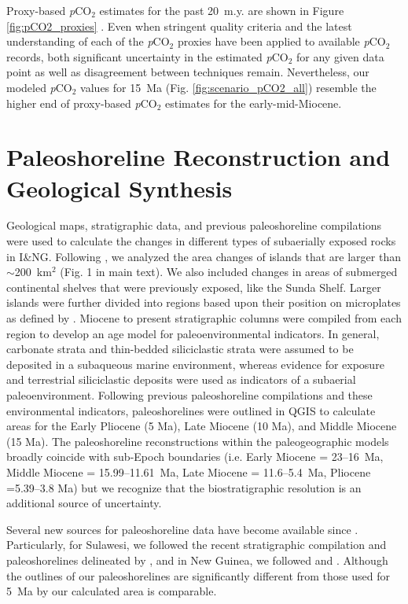 \documentclass[11pt,letterpaper]{article}
\newcommand{\pCOtwo}{\textit{p}CO$_{2}$\xspace}
\begin{document}
Proxy-based \pCOtwo estimates for the past 20~m.y. are shown in Figure \ref{fig:pCO2_proxies} \citep{Bereiter2015a, Foster2017a, Ji2018a}. Even when stringent quality criteria and the latest understanding of each of the \pCOtwo proxies have been applied to available \pCOtwo records, both significant uncertainty in the estimated \pCOtwo for any given data point as well as disagreement between techniques remain. Nevertheless, our modeled \pCOtwo values for 15~Ma (Fig. \ref{fig:scenario_pCO2_all}) resemble the higher end of proxy-based \pCOtwo estimates for the early-mid-Miocene.

\section*{Paleoshoreline Reconstruction and Geological Synthesis}

Geological maps, stratigraphic data, and previous paleoshoreline compilations were used to calculate the changes in different types of subaerially exposed rocks in I\&NG. Following \citet{Molnar2015a}, we analyzed the area changes of islands that are larger than $\sim$200~km$^{2}$ (Fig. 1 in main text). We also included changes in areas of submerged continental shelves that were previously exposed, like the Sunda Shelf. Larger islands were further divided into regions based upon their position on microplates as defined by \citep{Matthews2016a}. Miocene to present stratigraphic columns were compiled from each region to develop an age model for paleoenvironmental indicators. In general, carbonate strata and thin-bedded siliciclastic strata were assumed to be deposited in a subaqueous marine environment, whereas evidence for exposure and terrestrial siliciclastic deposits were used as indicators of a subaerial paleoenvironment. Following previous paleoshoreline compilations and these environmental indicators, paleoshorelines were outlined in QGIS to calculate areas for the Early Pliocene (5 Ma), Late Miocene (10 Ma), and Middle Miocene (15 Ma). The paleoshoreline reconstructions within the paleogeographic models broadly coincide with sub-Epoch boundaries (i.e. Early Miocene = 23--16~Ma, Middle Miocene = 15.99--11.61~Ma, Late Miocene = 11.6--5.4~Ma, Pliocene =5.39--3.8 Ma) but we recognize that the biostratigraphic resolution is an additional source of uncertainty.

Several new sources for paleoshoreline data have become available since \citet{Molnar2015a}. Particularly, for Sulawesi, we followed the recent stratigraphic compilation and paleoshorelines delineated by \citet{Nugraha2018a}, and in New Guinea, we followed \citet{Gold2017a} and \cite{Harrington2017a}. Although the outlines of our paleoshorelines are significantly different from those used for 5~Ma by \citet{Molnar2015a} our calculated area is comparable. 
\end{document}
